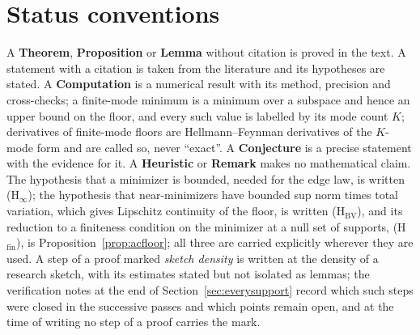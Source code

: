 \documentclass[11pt]{article}
\theoremstyle{definition}
\theoremstyle{remark}
\begin{document}
\section*{Status conventions}
A \textbf{Theorem}, \textbf{Proposition} or \textbf{Lemma} without citation is proved in the text. A statement with a citation is taken from the literature and its hypotheses are stated. A \textbf{Computation} is a numerical result with its method, precision and cross-checks; a finite-mode minimum is a minimum over a subspace and hence an upper bound on the floor, and every such value is labelled by its mode count $K$; derivatives of finite-mode floors are Hellmann--Feynman derivatives of the $K$-mode form and are called so, never ``exact''. A \textbf{Conjecture} is a precise statement with the evidence for it. A \textbf{Heuristic} or \textbf{Remark} makes no mathematical claim. The hypothesis that a minimizer is bounded, needed for the edge law, is written (H$_\infty$); the hypothesis that near-minimizers have bounded sup norm times total variation, which gives Lipschitz continuity of the floor, is written (H$_{\mathrm{BV}}$), and its reduction to a finiteness condition on the minimizer at a null set of supports, (H$_{\mathrm{fin}}$), is Proposition~\ref{prop:acfloor}; all three are carried explicitly wherever they are used. A step of a proof marked \emph{sketch density} is written at the density of a research sketch, with its estimates stated but not isolated as lemmas; the verification notes at the end of Section~\ref{sec:everysupport} record which such steps were closed in the successive passes and which points remain open, and at the time of writing no step of a proof carries the mark.
\end{document}
